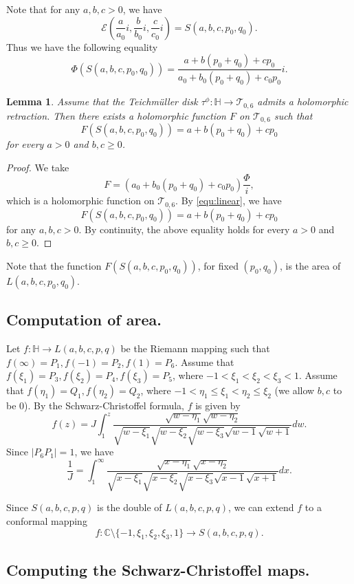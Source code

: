 \documentclass[11pt]{amsart}
\theoremstyle{plain}
\newtheorem{Lemma}[Theorem]{Lemma}
\newcommand{\Tei}{\mathcal{T}}
\begin{document}
Note that for any $a,b,c>0$, we have $$\mathcal{E}\left(\frac{a}{a_0}i,\frac{b}{b_0}i,\frac{c}{c_0}i\right)=S(a,b,c,p_0,q_0).$$ 
Thus we have the following equality \begin{equation}\label{equ:linear}
 \Phi(S(a,b,c,p_0,q_0))=\frac{a+b(p_0+q_0)+cp_0}{a_0+b_0(p_0+q_0)+c_0p_0}i.
\end{equation}


\begin{Lemma}\label{Lemma 4.2} Assume that the Teichm\"uller disk 
 $\tau^{\phi} : \mathbb{H} \to \Tei_{0,6}$ admits a holomorphic retraction. Then
there exists a holomorphic function $F$ on $\Tei_{0,6}$ such that $$F\left(S(a,b,c,p_0,q_0)\right)= a+b(p_0+q_0)+cp_0 $$ for every $a>0$ and $b,c\geq 0$.
\end{Lemma}

\begin{proof}
We take 
 $$F=\left( a_0+b_0(p_0+q_0)+c_0p_0\right) \frac{\Phi}{i},$$ which is a holomorphic function on $\Tei_{0,6}$. 
 By \eqref{equ:linear}, we have 
 $$F(S(a,b,c,p_0,q_0))= a+b(p_0+q_0)+cp_0$$ for any $a,b,c> 0$.
By continuity, the above equality holds for every $a>0$ and $b,c\geq 0$.
\end{proof}

Note that the function $F(S(a,b,c,p_0,q_0))$, for fixed $(p_0,q_0)$, is the area 
of  $L(a,b,c,p_0,q_0)$. 


\subsection{Computation of area.}\label{SCM}
Let $f:\mathbb{H} \to L(a,b,c,p,q)$ be the Riemann mapping such that $f(\infty)=P_1, f(-1)=P_2, f(1)=P_6$. Assume that
$f(\xi_1)=P_3, f(\xi_2)=P_4, f(\xi_3)=P_5$, where $-1<\xi_1<\xi_2<\xi_3<1$. Assume that 
$f(\eta_1)=Q_1, f(\eta_2)=Q_2$,  where $-1<\eta_1\leq\xi_1<\eta_2\leq\xi_2$ (we allow $b, c$
to be $0$). 
By  the Schwarz-Christoffel formula, $f$ is given by $$f(z)=J\int_1^z\frac{\sqrt{w-\eta_1}\sqrt{w-\eta_2}}{\sqrt{w-\xi_1}\sqrt{w-\xi_2}\sqrt{w-\xi_3}\sqrt{w-1}\sqrt{w+1}}dw.$$
Since $|P_6P_1|=1$, we have  $$\frac{1}{J}=\int_1^{\infty}\frac{\sqrt{x-\eta_1}\sqrt{x-\eta_2}}{\sqrt{x-\xi_1}\sqrt{x-\xi_2}\sqrt{x-\xi_3}\sqrt{x-1}\sqrt{x+1}}dx.$$

Since $S(a,b,c,p,q)$ is the double of $L(a,b,c,p,q)$, we can extend $f$ to a conformal mapping $$f: \mathbb{C}\setminus
\{-1,\xi_1,\xi_2,\xi_3,1\}\rightarrow S(a,b,c,p,q).$$ 

\subsection*{Computing the Schwarz-Christoffel maps.}
\end{document}
